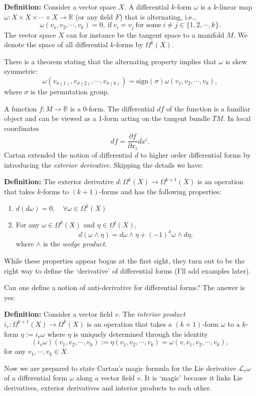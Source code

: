 \begin{description}
{{\bf Definition:} Consider a vector space $X$. A differential $k$-form $\omega$ is a $k$-linear map $\omega :X\times X\times\cdots\times X\rightarrow \mathbb R$ (or any field $F$) that is alternating, i.e.,
$$\omega(v_1,v_2,\cdots,v_k)=0,\ \mbox{if}\ v_i=v_j\ \mbox{for some}\ i\neq j\in\{1,2,\cdots,k\}.$$
The vector space $X$ can for instance be the tangent space to a manifold $M$. We denote the space of all differential $k$-forms by $\Omega^k(X)$.

There is a theorem stating that the alternating property implies that $\omega$ is skew symmetric:
$$\omega(v_{\sigma(1)},v_{\sigma(2)},\cdots,v_{\sigma(k)})=\mbox{sign}(\sigma)\omega(v_1,v_2,\cdots,v_k),$$
where $\sigma$ is the permutation group.

A function $f:M\rightarrow \mathbb R$ is a $0$-form. The differential
$df$ of the function is a familiar object and can be viewed as a 1-form
acting on the tangent bundle $TM$. In local coordinates
$$df = \frac{\partial f}{\partial x_i}dx^i.$$
Cartan extended the notion of differential $d$ to higher order
differential forms by introducing the \emph{exterior derivative}.
Skipping the details we have:

{\bf Definition:} The exterior derivative
$d:\Omega^k(X)\rightarrow\Omega^{k+1}(X)$ is an operation that takes
$k$-forms to $(k+1)$-forms and has the following properties:
\begin{enumerate}
\item $d(d\omega)=0,\quad\forall \omega\in \Omega^k(X)$
\item For any $\omega\in \Omega^k(X)$ and $\eta\in\Omega^l(X)$,
$$ d(\omega\wedge\eta)=d\omega\wedge\eta + (-1)^k\omega\wedge d\eta,$$
where $\wedge$ is the \emph{wedge product}.
\end{enumerate}
While these properties appear bogus at the first sight, they turn out to be the right way to define the `derivative' of differential forms (I'll add examples later).

Can one define a notion of anti-derivative for differential forms? The answer is yes:

{\bf Definition:} Consider a vector field $v$. The \emph{interior product} $i_v:\Omega^{k+1}(X)\rightarrow\Omega^k(X)$ is an operation that takes a $(k+1)$-form $\omega$ to a $k$-form $\eta:=i_v\omega$ where $\eta$ is uniquely determined through the identity
$$(i_v\omega)(v_1,v_2,\cdots,v_k):=\eta(v_1,v_2,\cdots,v_k)=\omega(v,v_1,v_2,\cdots,v_k),$$
for any $v_1,\cdots,v_k\in X$.

Now we are prepared to state Cartan's magic formula for the Lie derivative $\mathcal L_v\omega$ of a differential form $\omega$ along a vector field $v$. It is `magic' because it links Lie derivatives, exterior derivatives and interior products to each other.

}
\end{description}
